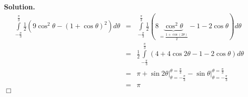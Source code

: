 \documentclass[12pt]{book}
\newenvironment{solution}{\textbf{Solution.} }{$\Box$}
\begin{document}
\begin{solution}
\[
\begin{array}{rcl}
\displaystyle\int\limits_{-\frac{\pi}{3}}^{\frac{\pi}{3}} \frac{1}2\left(9\cos^2\theta-(1+\cos\theta)^2\right) d\theta&=& \displaystyle\int\limits_{-\frac{\pi}{3}}^{\frac{\pi}{3}} \frac{1}2\left(8\underbrace{\cos^2\theta}_{=\frac{1+\cos(2\theta)}2  }-1-2\cos\theta \right) d\theta\\
&=&\displaystyle\frac{1}2\int\limits_{-\frac{\pi}{3}}^{\frac{\pi}{3}} \left(4+4 \cos 2\theta-1-2\cos\theta \right) d\theta
\\
&=&\pi+\left.\sin2\theta\right|_{\theta=-\frac{\pi}{3}}^{\theta=\frac{\pi}3}-\left.\sin\theta\right|_{\theta=-\frac{\pi}{3}}^{\theta=\frac{\pi}3}\\
&=&\pi
\end{array}
\]
\end{solution}

\printindex
\end{document}
